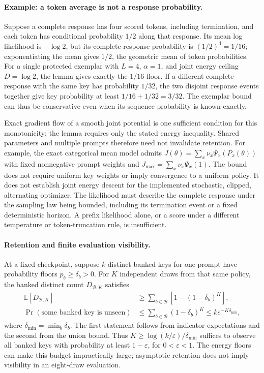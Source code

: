 \documentclass{article}
\newcommand{\1}{\mathbf 1}
\theoremstyle{remark}
\theoremstyle{definition}
\theoremstyle{plain}
\begin{document}
\paragraph{Example: a token average is not a response probability.}
Suppose a complete response has four scored tokens, including termination,
and each token has conditional probability $1/2$ along that response. Its
mean log likelihood is $-\log2$, but its complete-response probability is
$(1/2)^4=1/16$; exponentiating the mean gives $1/2$, the geometric mean of
token probabilities. For a single protected exemplar with $L=4$, $\alpha=1$,
and joint energy ceiling $D=\log2$, the lemma gives exactly the $1/16$ floor.
If a different complete response with the same key has probability $1/32$,
the two disjoint response events together give key probability at least
$1/16+1/32=3/32$. The exemplar bound can thus be conservative even when its
sequence probability is known exactly.

Exact gradient flow of a smooth joint potential is one sufficient condition
for this monotonicity; the lemma requires only the stated energy inequality.
Shared parameters and multiple prompts therefore need not invalidate
retention. For example, the exact categorical mean model admits
$J(\theta)=\sum_x\nu_x\Psi_x(P_x(\theta))$ with fixed nonnegative prompt
weights and $J_{\max}=\sum_x\nu_x\Psi_x(1)$. The bound does not require
uniform key weights or imply convergence to a uniform policy. It does not
establish joint energy descent for the implemented stochastic, clipped,
alternating optimizer. The likelihood must describe the complete response
under the sampling law being bounded, including its termination event or a
fixed deterministic horizon. A prefix likelihood alone, or a score under a
different temperature or token-truncation rule, is insufficient.

\paragraph{Retention and finite evaluation visibility.}
At a fixed checkpoint, suppose $k$ distinct banked keys for one prompt have
probability floors $p_b\ge\delta_b>0$. For $K$ independent draws from that
same policy, the banked distinct count $D_{\mathcal B,K}$ satisfies
\[
 \begin{aligned}
 \mathbb E[D_{\mathcal B,K}]
 &\ge\sum_{b\in\mathcal B}\left[1-(1-\delta_b)^K\right],\\
 \Pr(\text{some banked key is unseen})
 &\le\sum_{b\in\mathcal B}(1-\delta_b)^K
 \le k e^{-K\delta_{\min}},
 \end{aligned}
\]
where $\delta_{\min}=\min_b\delta_b$. The first statement follows from
indicator expectations and the second from the union bound. Thus
$K\ge\log(k/\varepsilon)/\delta_{\min}$ suffices to observe all banked keys
with probability at least $1-\varepsilon$, for $0<\varepsilon<1$.
The energy floors can make this budget impractically large; asymptotic
retention does not imply visibility in an eight-draw evaluation.
\end{document}
